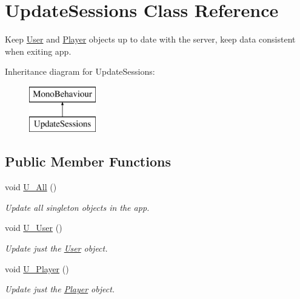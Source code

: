 \hypertarget{class_update_sessions}{}\section{Update\+Sessions Class Reference}
\label{class_update_sessions}


Keep \mbox{\hyperlink{class_user}{User}} and \mbox{\hyperlink{class_player}{Player}} objects up to date with the server, keep data consistent when exiting app.  


Inheritance diagram for Update\+Sessions\+:\begin{figure}[H]
\begin{center}
\leavevmode
\includegraphics[height=2.000000cm]{class_update_sessions}
\end{center}
\end{figure}
\subsection*{Public Member Functions}
\begin{DoxyCompactItemize}
\item 
void \mbox{\hyperlink{class_update_sessions_a0ea698e5b708671e7ba25a160b325833}{U\+\_\+\+All}} ()
\begin{DoxyCompactList}\small\item\em Update all singleton objects in the app. \end{DoxyCompactList}\item 
void \mbox{\hyperlink{class_update_sessions_adf570975af9bca48413a5d6b0cbf24b1}{U\+\_\+\+User}} ()
\begin{DoxyCompactList}\small\item\em Update just the \mbox{\hyperlink{class_user}{User}} object. \end{DoxyCompactList}\item 
void \mbox{\hyperlink{class_update_sessions_a888b2a028e131e41ea7e34607c0a5d45}{U\+\_\+\+Player}} ()
\begin{DoxyCompactList}\small\item\em Update just the \mbox{\hyperlink{class_player}{Player}} object. \end{DoxyCompactList}\end{DoxyCompactItemize}
